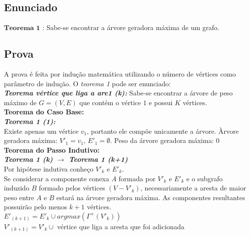 \documentclass[12pt]{article}
\begin{document}
\subsection{ Enunciado }
\indent  $\mathbf{Teorema}$ $\mathbf{1}$ : Sabe-se encontrar a árvore geradora máxima de um grafo.

\subsection{ Prova }
\indent A prova é feita por indução matemática utilizando o número de vértices como parâmetro de indução. O \textit{teorema 1} pode ser enunciado:\\

\textit{\textbf{Teorema vértice que liga a are1 (k):}} Sabe-se encontrar a árvore de peso máximo de $G=(V,E)$ que contém o vértice $1$ e possui $K$ vértices.\\

\textbf{Teorema do Caso Base:}\\

\textit{\textbf{Teorema 1 (1):}}\\
Existe apenas um vértice $v_1$, portanto ele compõe unicamente a árvore.
Àrvore geradora máxima: $V'_1 = {v_1}$, $E'_1 = \emptyset$.
Peso da árvore geradora máxima: 0\\

\textbf{Teorema do Passo Indutivo:}\\

\textit{\textbf{Teorema 1 (k) $\rightarrow$ Teorema 1 (k+1)}}\\
Por hipótese indutiva conheço $V'_k$ e $E'_k$.\\
Se considerar a componente conexa $A$ formada por $V'_k$ e $E'_k$ e o subgrafo induzido $B$ formado pelos
vértices $\left(V - V'_k\right)$, necessariamente a aresta de maior peso entre $A$ e $B$ estará na árvore geradora máxima. As componentes resultantes possuirão
pelo menos $k+1$ vértices.\\

$E'_{(k+1)} = E'_k \cup {argmax(\Gamma^+(V'_k))}$\\
$V'_{(k+1)} = V'_k \cup$ vértice que liga a aresta que foi adicionada\\
\end{document}
